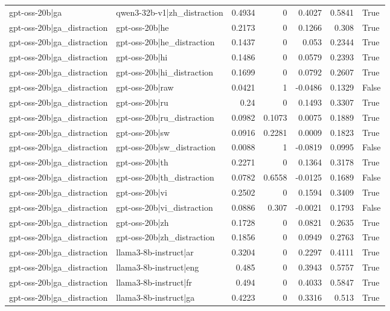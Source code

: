 \begin{table}
\begin{tabular}{l l r r r r l}
gpt-oss-20b|ga & qwen3-32b-v1|zh_distraction & 0.4934 & 0 & 0.4027 & 0.5841 & True \\
gpt-oss-20b|ga_distraction & gpt-oss-20b|he & 0.2173 & 0 & 0.1266 & 0.308 & True \\
gpt-oss-20b|ga_distraction & gpt-oss-20b|he_distraction & 0.1437 & 0 & 0.053 & 0.2344 & True \\
gpt-oss-20b|ga_distraction & gpt-oss-20b|hi & 0.1486 & 0 & 0.0579 & 0.2393 & True \\
gpt-oss-20b|ga_distraction & gpt-oss-20b|hi_distraction & 0.1699 & 0 & 0.0792 & 0.2607 & True \\
gpt-oss-20b|ga_distraction & gpt-oss-20b|raw & 0.0421 & 1 & -0.0486 & 0.1329 & False \\
gpt-oss-20b|ga_distraction & gpt-oss-20b|ru & 0.24 & 0 & 0.1493 & 0.3307 & True \\
gpt-oss-20b|ga_distraction & gpt-oss-20b|ru_distraction & 0.0982 & 0.1073 & 0.0075 & 0.1889 & True \\
gpt-oss-20b|ga_distraction & gpt-oss-20b|sw & 0.0916 & 0.2281 & 0.0009 & 0.1823 & True \\
gpt-oss-20b|ga_distraction & gpt-oss-20b|sw_distraction & 0.0088 & 1 & -0.0819 & 0.0995 & False \\
gpt-oss-20b|ga_distraction & gpt-oss-20b|th & 0.2271 & 0 & 0.1364 & 0.3178 & True \\
gpt-oss-20b|ga_distraction & gpt-oss-20b|th_distraction & 0.0782 & 0.6558 & -0.0125 & 0.1689 & False \\
gpt-oss-20b|ga_distraction & gpt-oss-20b|vi & 0.2502 & 0 & 0.1594 & 0.3409 & True \\
gpt-oss-20b|ga_distraction & gpt-oss-20b|vi_distraction & 0.0886 & 0.307 & -0.0021 & 0.1793 & False \\
gpt-oss-20b|ga_distraction & gpt-oss-20b|zh & 0.1728 & 0 & 0.0821 & 0.2635 & True \\
gpt-oss-20b|ga_distraction & gpt-oss-20b|zh_distraction & 0.1856 & 0 & 0.0949 & 0.2763 & True \\
gpt-oss-20b|ga_distraction & llama3-8b-instruct|ar & 0.3204 & 0 & 0.2297 & 0.4111 & True \\
gpt-oss-20b|ga_distraction & llama3-8b-instruct|eng & 0.485 & 0 & 0.3943 & 0.5757 & True \\
gpt-oss-20b|ga_distraction & llama3-8b-instruct|fr & 0.494 & 0 & 0.4033 & 0.5847 & True \\
gpt-oss-20b|ga_distraction & llama3-8b-instruct|ga & 0.4223 & 0 & 0.3316 & 0.513 & True \\

\end{tabular}
\end{table}
